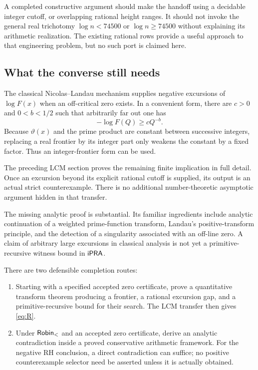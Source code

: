 A completed constructive argument should make the handoff using a
decidable integer cutoff, or overlapping rational height ranges.
It should not invoke the general real trichotomy
$\log n<74500$ or $\log n\ge74500$ without explaining its arithmetic
realization. The existing rational rows provide a useful approach to
that engineering problem, but no such port is claimed here.

\subsection{What the converse still needs}

The classical Nicolas--Landau mechanism supplies negative excursions
of $\log F(x)$ when an off-critical zero exists. In a convenient form,
there are $c>0$ and $0<b<1/2$ such that arbitrarily far out one has
\[
 -\log F(Q)\ge cQ^{-b}.
\]
Because $\vartheta(x)$ and the prime product are constant between
successive integers, replacing a real frontier by its integer part
only weakens the constant by a fixed factor. Thus an integer-frontier
form can be used.

The preceding LCM section proves the remaining finite implication
in full detail. Once an excursion beyond its explicit rational
cutoff is supplied, its output is an actual strict counterexample.
There is no additional number-theoretic asymptotic argument hidden
in that transfer.

The missing analytic proof is substantial. Its familiar ingredients
include analytic continuation of a weighted prime-function transform,
Landau's positive-transform principle, and the detection of a
singularity associated with an off-line zero. A claim of arbitrary
large excursions in classical analysis is not yet a
primitive-recursive witness bound in $\mathsf{iPRA}$.

There are two defensible completion routes:
\begin{enumerate}[leftmargin=*]
\item Starting with a specified accepted zero certificate, prove a
quantitative transform theorem producing a frontier, a rational
excursion gap, and a primitive-recursive bound for their search.
The LCM transfer then gives \eqref{eq:R}.
\item Under $\mathsf{Robin}_{<}$ and an accepted zero certificate, derive an
analytic contradiction inside a proved conservative arithmetic
framework. For the negative RH conclusion, a direct contradiction
can suffice; no positive counterexample selector need be asserted
unless it is actually obtained.
\end{enumerate}

